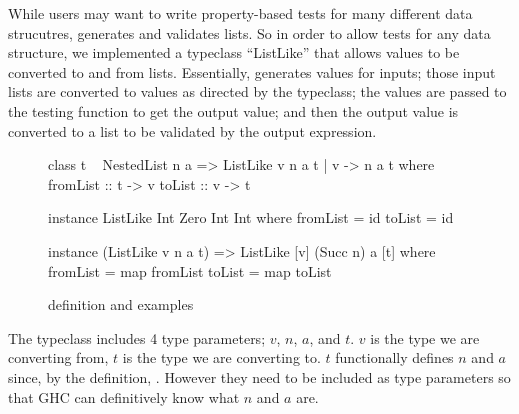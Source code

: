 While users may want to write property-based tests for many different data strucutres, \ourDSL generates and validates lists.
So in order to allow tests for any data structure, we implemented a typeclass ``ListLike'' that allows values to be converted
to and from lists. Essentially, \ourDSL generates values for inputs; those input lists are converted to values as directed by
the typeclass; the values are passed to the testing function to get the output value; and then the output value is converted
to a list to be validated by the output expression.

\begin{figure}
    \begin{smallhskcode}
class t ~ NestedList n a => ListLike v n a t | v -> n a t where
    fromList :: t -> v
    toList :: v -> t

instance ListLike Int Zero Int Int where
        fromList = id
        toList = id

instance (ListLike v n a t) => ListLike [v] (Succ n) a [t] where
        fromList = map fromList
        toList = map toList
    \end{smallhskcode}
    \caption{ definition and examples}
    \label{fig:listlike-qq}
\end{figure}

The typeclass includes 4 type parameters; $v$, $n$, $a$, and $t$. $v$ is the type we are converting from, 
$t$ is the type we are converting to. $t$ functionally defines $n$ and $a$ since, by the definition, .
However they need to be included as type parameters so that GHC can definitively know what $n$ and $a$ are.
